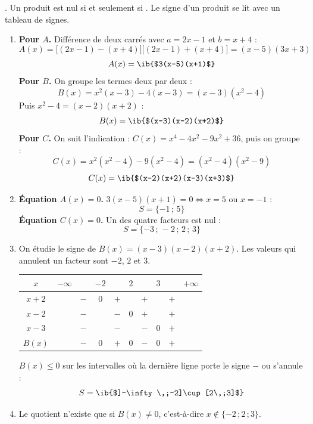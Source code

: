 \begin{prop}[Outils]
. Un produit est nul si et seulement si . Le signe d'un produit se lit avec un tableau de signes.
\end{prop}
\begin{enumerate}
  \item \textbf{Pour $A$.} Différence de deux carrés avec $a=2x-1$ et $b=x+4$ :
  \[A(x)=\big[(2x-1)-(x+4)\big]\big[(2x-1)+(x+4)\big]=(x-5)(3x+3)\]
  \[A(x)=\ib{$3(x-5)(x+1)$}\]
  \textbf{Pour $B$.} On groupe les termes deux par deux :
  \[B(x)=x^2(x-3)-4(x-3)=(x-3)(x^2-4)\]
  Puis $x^2-4=(x-2)(x+2)$ :
  \[B(x)=\ib{$(x-3)(x-2)(x+2)$}\]
  \textbf{Pour $C$.} On suit l'indication : $C(x)=x^4-4x^2-9x^2+36$, puis on groupe :
  \[C(x)=x^2(x^2-4)-9(x^2-4)=(x^2-4)(x^2-9)\]
  \[C(x)=\ib{$(x-2)(x+2)(x-3)(x+3)$}\]

  \item \textbf{Équation $A(x)=0$.} $3(x-5)(x+1)=0\iff x=5$ ou $x=-1$ :
  \[S=\{-1\,;\,5\}\]
  \textbf{Équation $C(x)=0$.} Un des quatre facteurs est nul :
  \[S=\{-3\,;\,-2\,;\,2\,;\,3\}\]

  \item On étudie le signe de $B(x)=(x-3)(x-2)(x+2)$. Les valeurs qui annulent un facteur sont $-2$, $2$ et $3$.
  \begin{center}
\begin{tabular}{c|ccccccccc}
$x$ & $-\infty$ &  & $-2$ &  & $2$ &  & $3$ &  & $+\infty$ \\ \hline
$x+2$ &  & $-$ & $0$ & $+$ &  & $+$ &  & $+$ &  \\
$x-2$ &  & $-$ &  & $-$ & $0$ & $+$ &  & $+$ &  \\
$x-3$ &  & $-$ &  & $-$ &  & $-$ & $0$ & $+$ &  \\
$B(x)$ &  & $-$ & $0$ & $+$ & $0$ & $-$ & $0$ & $+$ &  \\
\end{tabular}
\end{center}
  $B(x)\leq0$ sur les intervalles où la dernière ligne porte le signe $-$ ou s'annule :
  \[S=\ib{$]-\infty\,;-2]\cup[2\,;3]$}\]

  \item Le quotient n'existe que si $B(x)\neq0$, c'est-à-dire $x\notin\{-2\,;2\,;3\}$.


\end{enumerate}

